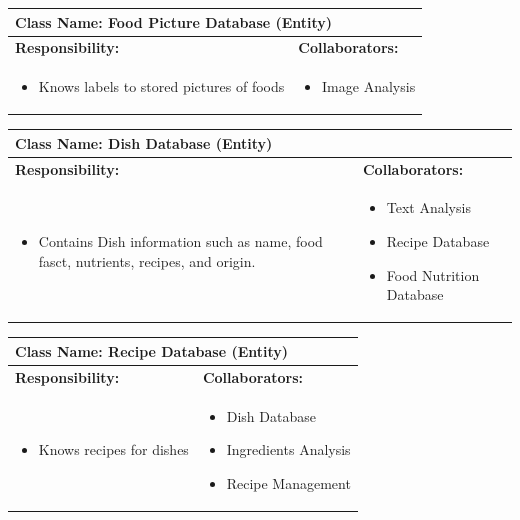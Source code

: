 \documentclass[]{article}
\begin{document}
\begin{table}[H]
	\centering
	\begin{tabular}{|p{7cm}|p{7cm}|}
	\hline 
	 \multicolumn{2}{|l|}{\textbf{Class Name:} Food Picture Database (Entity) }\\
	\hline
	\textbf{Responsibility:} & \textbf{Collaborators:} \\
	\hline
	\raggedright
	\begin{itemize}
		\item Knows labels to stored pictures of foods 
	\end{itemize}
	\vspace{1in} & 
	\begin{itemize}
		\item Image Analysis
	\end{itemize} \\
	\hline
	\end{tabular}
\end{table}

\begin{table}[H]
	\centering
	\begin{tabular}{|p{7cm}|p{7cm}|}
	\hline 
	 \multicolumn{2}{|l|}{\textbf{Class Name:} Dish Database (Entity) }\\
	\hline
	\textbf{Responsibility:} & \textbf{Collaborators:} \\
	\hline
	\raggedright
	\begin{itemize}
		\item Contains Dish information such as name, food fasct, nutrients, recipes, and origin.
	\end{itemize}
	\vspace{1in} & 
	\begin{itemize}
		\item Text Analysis
		\item Recipe Database
		\item Food Nutrition Database
	\end{itemize} \\
	\hline
	\end{tabular}
\end{table}

\begin{table}[H]
	\centering
	\begin{tabular}{|p{7cm}|p{7cm}|}
	\hline 
	 \multicolumn{2}{|l|}{\textbf{Class Name:} Recipe Database (Entity) }\\
	\hline
	\textbf{Responsibility:} & \textbf{Collaborators:} \\
	\hline
	\raggedright
	\begin{itemize}
		\item Knows recipes for dishes
	\end{itemize}
	\vspace{1in} & 
	\begin{itemize}
		\item Dish Database
		\item Ingredients Analysis
		\item Recipe Management
	\end{itemize} \\
	\hline
	\end{tabular}
\end{table}
\end{document}
